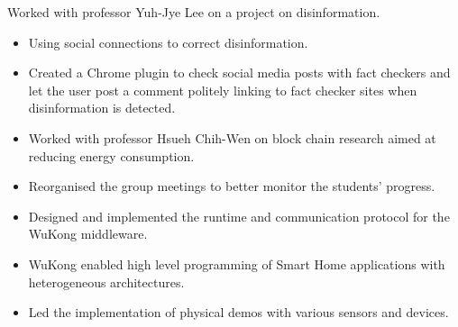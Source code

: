 \documentclass[10pt,a4paper]{../altacv}
\begin{document}
\medskip




\medskip\medskip{}

Worked with professor Yuh-Jye Lee on a project on disinformation.

\medskip

\begin{itemize}
	\item Using social connections to correct disinformation.
	\item Created a Chrome plugin to check social media posts with fact checkers and let the user post a comment politely linking to fact checker sites when disinformation is detected.
\end{itemize}

\medskip



\newpage
{\marginpar{\vspace*{\dimexpr1pt-\baselineskip}\raggedright}}

\begin{itemize}
	\item Worked with professor Hsueh Chih-Wen on block chain research aimed at reducing energy consumption.
	\item Reorganised the group meetings to better monitor the students' progress.
\end{itemize}

\medskip



\medskip\medskip{}


\begin{itemize}
	\item Designed and implemented the runtime and communication protocol for the WuKong middleware.
	\item WuKong enabled high level programming of Smart Home applications with heterogeneous architectures.
	\item Led the implementation of physical demos with various sensors and devices.
\end{itemize}
\end{document}
